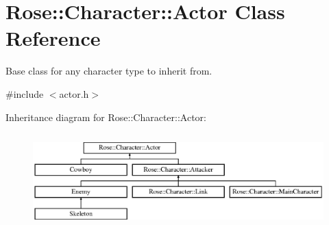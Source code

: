 \hypertarget{classRose_1_1Character_1_1Actor}{}\section{Rose\+::Character\+::Actor Class Reference}
\label{classRose_1_1Character_1_1Actor}


Base class for any character type to inherit from.  




{\ttfamily \#include $<$actor.\+h$>$}

Inheritance diagram for Rose\+::Character\+::Actor\+:\begin{figure}[H]
\begin{center}
\leavevmode
\includegraphics[height=3.696370cm]{classRose_1_1Character_1_1Actor}
\end{center}
\end{figure}

